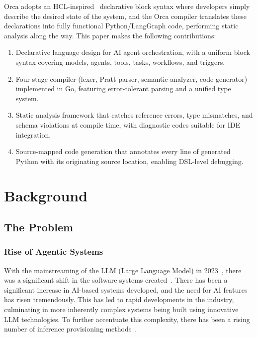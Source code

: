 \documentclass[sigconf,nonacm]{acmart}
\begin{document}
Orca adopts an HCL-inspired~\cite{terraform2024} declarative block syntax
where developers simply describe the desired state of the system, and the
Orca compiler translates these declarations into fully functional
Python/LangGraph code, performing static analysis along the way. This paper
makes the following contributions:
\begin{enumerate}[leftmargin=*]
  \item Declarative language design for AI agent orchestration, with a
        uniform block syntax covering models, agents, tools, tasks,
        workflows, and triggers.
  \item Four-stage compiler (lexer, Pratt parser, semantic analyzer, code
        generator) implemented in Go, featuring error-tolerant parsing and a
        unified type system.
  \item Static analysis framework that catches reference errors, type
        mismatches, and schema violations at compile time, with diagnostic
        codes suitable for IDE integration.
  \item Source-mapped code generation that annotates every line of
        generated Python with its originating source location, enabling
        DSL-level debugging.
\end{enumerate}

\section{Background}
\label{sec:background}

\subsection{The Problem}
\label{sec:background:problem}

\subsubsection{Rise of Agentic Systems}
\label{sec:background:rise}

With the mainstreaming of the LLM (Large Language Model) in
2023~\cite{benaich2023stateofai}, there was a significant shift in the
software systems created~\cite{autogen2024}. There has been a significant
increase in AI-based systems developed, and the need for AI features has
risen tremendously. This has led to rapid developments in the industry,
culminating in more inherently complex systems being built using innovative
LLM technologies. To further accentuate this complexity, there has been a
rising number of inference provisioning methods~\cite{autogen2024}.
\end{document}
